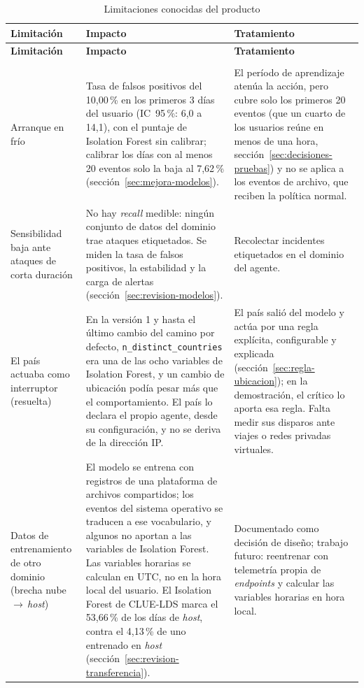 \begin{longtable}{>{\raggedright\arraybackslash}p{4.4cm}>{\raggedright\arraybackslash}p{5.0cm}>{\raggedright\arraybackslash}p{4.7cm}}
	\caption{Limitaciones conocidas del producto}
	\label{tab:limitaciones-producto}\\
	\hline
	\textbf{Limitación} & \textbf{Impacto} & \textbf{Tratamiento} \\
	\hline
	\endfirsthead
	\hline
	\textbf{Limitación} & \textbf{Impacto} & \textbf{Tratamiento} \\
	\hline
	\endhead
	\multicolumn{3}{l}{\textit{Modelo y detección}} \\
	\hline
	Arranque en frío & Tasa de falsos positivos del 10,00\,\% en los primeros 3 días del usuario (IC~95\,\%: 6,0 a 14,1), con el puntaje de Isolation Forest sin calibrar; calibrar los días con al menos 20 eventos solo la baja al 7,62\,\% (sección~\ref{sec:mejora-modelos}). & El período de aprendizaje atenúa la acción, pero cubre solo los primeros 20 eventos (que un cuarto de los usuarios reúne en menos de una hora, sección~\ref{sec:decisiones-pruebas}) y no se aplica a los eventos de archivo, que reciben la política normal. \\
	\hline
	Sensibilidad baja ante ataques de corta duración & No hay \emph{recall} medible: ningún conjunto de datos del dominio trae ataques etiquetados. Se miden la tasa de falsos positivos, la estabilidad y la carga de alertas (sección~\ref{sec:revision-modelos}). & Recolectar incidentes etiquetados en el dominio del agente. \\
	\hline
	El país actuaba como interruptor (resuelta) & En la versión 1 y hasta el último cambio del camino por defecto, \texttt{n\_\allowbreak{}distinct\_\allowbreak{}countries} era una de las ocho variables de Isolation Forest, y un cambio de ubicación podía pesar más que el comportamiento. El país lo declara el propio agente, desde su configuración, y no se deriva de la dirección IP. & El país salió del modelo y actúa por una regla explícita, configurable y explicada (sección~\ref{sec:regla-ubicacion}); en la demostración, el crítico lo aporta esa regla. Falta medir sus disparos ante viajes o redes privadas virtuales. \\
	\hline
	Datos de entrenamiento de otro dominio (brecha nube\,$\rightarrow$\,\emph{host}) & El modelo se entrena con registros de una plataforma de archivos compartidos; los eventos del sistema operativo se traducen a ese vocabulario, y algunos no aportan a las variables de Isolation Forest. Las variables horarias se calculan en UTC, no en la hora local del usuario. El Isolation Forest de CLUE-LDS marca el 53,66\,\% de los días de \emph{host}, contra el 4,13\,\% de uno entrenado en \emph{host} (sección~\ref{sec:revision-transferencia}). & Documentado como decisión de diseño; trabajo futuro: reentrenar con telemetría propia de \emph{endpoints} y calcular las variables horarias en hora local. \\

\end{longtable}
